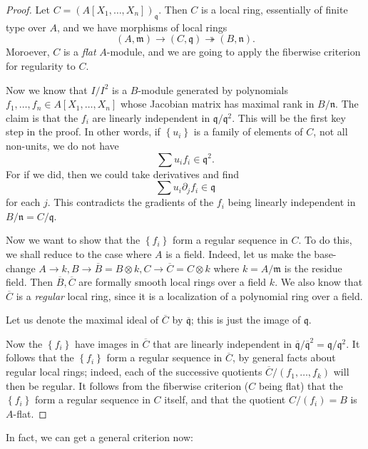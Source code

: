 \begin{proof} 
Let $C = (A[X_1, \dots, X_n])_{\mathfrak{q}}$. Then $C$ is a local ring,
essentially of finite type over $A$, and we have morphisms of local rings
\[ (A, \mathfrak{m}) \to (C, \mathfrak{q}) \twoheadrightarrow (B,
\mathfrak{n}).  \]
Moroever, $C$ is a \emph{flat} $A$-module, and we are going to apply the
fiberwise criterion for regularity to $C$.

Now we know that $I/I^2$ is a $B$-module generated by polynomials $f_1, \dots, f_n
\in A[X_1, \dots, X_n]$
whose Jacobian matrix has maximal rank in $B/\mathfrak{n}$.
The claim is that the $f_i$ are linearly independent in
$\mathfrak{q}/\mathfrak{q}^2$. This will be the first key step in the proof.
In other words, if $\left\{u_i\right\}$ is a family of elements of $C$, not all
non-units, we do not have
\[ \sum u_i f_i \in \mathfrak{q}^2.  \]
For if we did, then we could take derivatives
and find
\[ \sum u_i \partial_j f_i \in \mathfrak{q}  \]
for each $j$. This contradicts the gradients of the $f_i$ being linearly
independent in $B/\mathfrak{n} = C/\mathfrak{q}$. 

Now we want to show that the $\left\{f_i\right\}$ form a regular sequence in
$C$. To do this, we shall reduce to the case where $A$ is a field. Indeed, let
us make the base-change $A \to k, B \to \overline{B} = B \otimes k, C \to \overline{C}=C \otimes k$ where $k  =
A/\mathfrak{m}$ is the residue field.
Then $\overline{B},\overline{C}$ are  formally smooth local rings over a
field $k$. We also know that $\overline{C}$ is a \emph{regular} local ring,
since it is a localization of a polynomial ring over a field. 


Let us denote the maximal ideal of
$\overline{C}$ by
$\overline{\mathfrak{q}}$; this is just the image of $\mathfrak{q}$.


Now the $\left\{f_i\right\}$ have images in $\overline{C}$ that are linearly
independent
in $\overline{\mathfrak{q}}/\overline{\mathfrak{q}}^2 =
\mathfrak{q}/\mathfrak{q}^2$. It follows that the $\left\{f_i\right\}$ form a
regular sequence in $\overline{C}$, by general facts about regular local
rings; indeed, each of the successive quotients $\overline{C}/(f_1, \dots,
f_k)$ will then be regular.
It follows from the fiberwise criterion ($C$ being flat) that the
$\left\{f_i\right\}$ form a regular sequence in $C$ itself, and that the
quotient $C/(f_i) = B$ is $A$-flat.
\end{proof} 

In fact, we can get a general criterion now:

